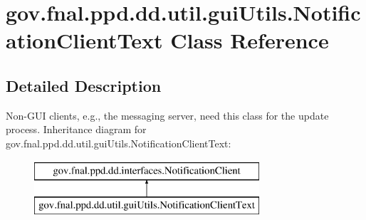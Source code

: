 \hypertarget{classgov_1_1fnal_1_1ppd_1_1dd_1_1util_1_1guiUtils_1_1NotificationClientText}{\section{gov.\-fnal.\-ppd.\-dd.\-util.\-gui\-Utils.\-Notification\-Client\-Text Class Reference}
\label{classgov_1_1fnal_1_1ppd_1_1dd_1_1util_1_1guiUtils_1_1NotificationClientText}
}


\subsection{Detailed Description}
Non-\/\-G\-U\-I clients, e.\-g., the messaging server, need this class for the update process. Inheritance diagram for gov.\-fnal.\-ppd.\-dd.\-util.\-gui\-Utils.\-Notification\-Client\-Text\-:\begin{figure}[H]
\begin{center}
\leavevmode
\includegraphics[height=2.000000cm]{classgov_1_1fnal_1_1ppd_1_1dd_1_1util_1_1guiUtils_1_1NotificationClientText}
\end{center}
\end{figure}
